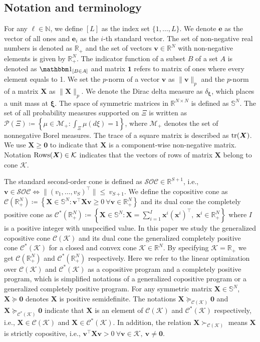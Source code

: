 \documentclass{article}
\newcommand{\RR}{\mathbb{R}}
\newcommand{\tr}{\textup{tr}}
\begin{document}
\subsection{Notation and terminology}
For any $\ell \in \mathbb{N}$, we define $[L]$ as the index set $\{1, \dots, L\}$. We denote $\mathbf{e}$ as the vector of all ones and  $\mathbf{e}_i$ as the $i$-th standard vector. The set of non-negative real numbers is denoted as $\RR_{+}$ and the set of vectors $\bm v \in \RR^{N}$ with non-negative elements is given by $\RR^{N}_{+}$. The indicator function of a subset $B$ of a set $A$ is denoted as $\mathbbm 1_{[B \in A]}$ and matrix $\bm 1$ refers to matrix of ones where every element equals to 1. We set the $p$-norm of a vector $\bm v$ as $\| \bm v \|_p$ and the $p$-norm of a matrix $\bm X$ as $\| \bm X \|_p$. We denote the Dirac delta measure as $\delta_{\bm\xi}$, which places a unit mass at $\bm\xi$. The space of symmetric matrices in $\RR^{N \times N}$ is defined as $\mathbb{S}^{N}$. The set of all probability measures supported on $\Xi$ is written as $\mathcal{P} (\Xi) \coloneqq \left\{ \mu \in\mathcal M_+: \int_{\Xi} \mu(d\xi) = 1 \right\}$, where $\mathcal M_+$ denotes the set of nonnegative Borel measures. The trace of a square matrix is described as $\tr(\bm X)$. We use $\bm X \geq \bm 0$ to indicate that $\bm X$ is a component-wise non-negative matrix. Notation $\textup{Rows}(\bm X) \in \mathcal{K}$ indicates that the vectors of rows of matrix $\bm X$ belong to cone $\mathcal{K}$.

The standard second-order cone is defined as $\mathcal{SOC} \in \RR^{S+1}$, i.e., $\bm v \in \mathcal{SOC} \Longleftrightarrow \|(v_1, \dots, v_S)^\top \| \leq~v_{S+1}$. We define the copositive cone as $\mathcal{C}(\RR^N_{+}) \coloneqq \left \{ \bm X \in \mathbb{S}^N: \bm v^\top \bm X \bm v \geq 0 \ \forall \bm v \in \RR^N_{+} \right \}$ and its dual cone the completely positive cone as $\mathcal{C}^*(\RR^N_{+}) \coloneqq \left \{ \bm X \in \mathbb{S}^N: \bm X = \sum_{i=1}^I \bm x^i(\bm x^i)^\top, \ \bm x^i \in \RR^N_{+} \right \}$ where $I$ is a positive integer with unspecified value. In this paper we study the generalized copositive cone $\mathcal{C(K)}$ and its dual cone the generalized completely positive cone $\mathcal{C^*(K)}$ for a closed and convex cone $\mathcal{K} \in \RR^N$. By specifying $\mathcal{K} = \RR_+$ we get $\mathcal{C}(\RR^N_{+})$ and $\mathcal{C}^*(\RR^N_{+})$ respectively. Here we refer to the linear optimization over $\mathcal{C(K)}$ and $\mathcal{C^*(K)}$ as a copositive program and a completely positive program, which is simplified notations of a generalized copositive program or a generalized completely positive program. For any symmetric matrix $\bm X \in \mathbb{S}^N$, $\bm X \succeq \bm 0$ denotes $\bm X$ is positive semidefinite. The notations $\bm X \succeq_{\mathcal{C(K)}} \bm 0$ and $\bm X \succeq_{\mathcal{C^*(K)}} \bm 0$ indicate that $\bm X$ is an element of $\mathcal{C(K)}$ and $\mathcal{C^*(K)}$ respectively, i.e., $\bm X \in \mathcal{C(K)}$ and $\bm X \in \mathcal{C^*(K)}$. In addition, the relation $\bm X \succ_{\mathcal{C(K)}}$ means $\bm X$ is  strictly copositive, i.e., $\bm v^\top \bm X \bm v > 0 \ \forall \bm v \in \mathcal{K}, \ \bm v \neq \bm 0$.
\end{document}

